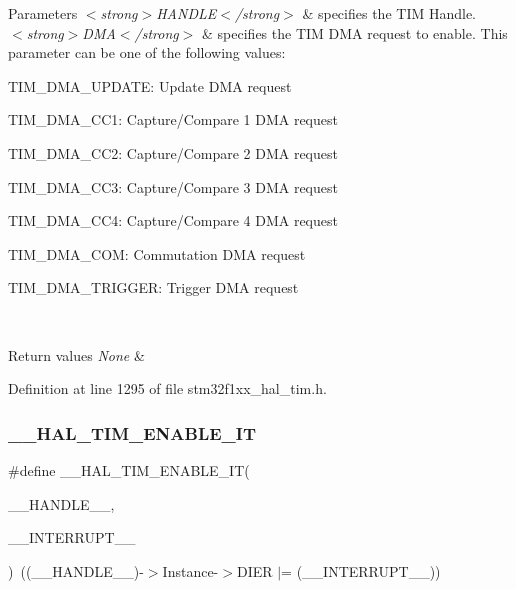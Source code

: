 \begin{DoxyParams}{Parameters}
{\em $<$strong$>$\+H\+A\+N\+D\+L\+E$<$/strong$>$} & specifies the T\+IM Handle. \\
\hline
{\em $<$strong$>$\+D\+M\+A$<$/strong$>$} & specifies the T\+IM D\+MA request to enable. This parameter can be one of the following values\+: \begin{DoxyItemize}
\item T\+I\+M\+\_\+\+D\+M\+A\+\_\+\+U\+P\+D\+A\+TE\+: Update D\+MA request \item T\+I\+M\+\_\+\+D\+M\+A\+\_\+\+C\+C1\+: Capture/\+Compare 1 D\+MA request \item T\+I\+M\+\_\+\+D\+M\+A\+\_\+\+C\+C2\+: Capture/\+Compare 2 D\+MA request \item T\+I\+M\+\_\+\+D\+M\+A\+\_\+\+C\+C3\+: Capture/\+Compare 3 D\+MA request \item T\+I\+M\+\_\+\+D\+M\+A\+\_\+\+C\+C4\+: Capture/\+Compare 4 D\+MA request \item T\+I\+M\+\_\+\+D\+M\+A\+\_\+\+C\+OM\+: Commutation D\+MA request \item T\+I\+M\+\_\+\+D\+M\+A\+\_\+\+T\+R\+I\+G\+G\+ER\+: Trigger D\+MA request \end{DoxyItemize}
\\
\hline
\end{DoxyParams}

\begin{DoxyRetVals}{Return values}
{\em None} & \\
\hline
\end{DoxyRetVals}


Definition at line 1295 of file stm32f1xx\+\_\+hal\+\_\+tim.\+h.

\mbox{\label{group___t_i_m___exported___macros_ga4d69943bc4716743c78e3194e259097e}} 
\subsubsection{\texorpdfstring{\+\_\+\+\_\+\+H\+A\+L\+\_\+\+T\+I\+M\+\_\+\+E\+N\+A\+B\+L\+E\+\_\+\+IT}{\_\_HAL\_TIM\_ENABLE\_IT}}
{\footnotesize\ttfamily \#define \+\_\+\+\_\+\+H\+A\+L\+\_\+\+T\+I\+M\+\_\+\+E\+N\+A\+B\+L\+E\+\_\+\+IT(\begin{DoxyParamCaption}\item[{}]{\+\_\+\+\_\+\+H\+A\+N\+D\+L\+E\+\_\+\+\_\+,  }\item[{}]{\+\_\+\+\_\+\+I\+N\+T\+E\+R\+R\+U\+P\+T\+\_\+\+\_\+ }\end{DoxyParamCaption})~((\+\_\+\+\_\+\+H\+A\+N\+D\+L\+E\+\_\+\+\_\+)-\/$>$Instance-\/$>$D\+I\+ER $\vert$= (\+\_\+\+\_\+\+I\+N\+T\+E\+R\+R\+U\+P\+T\+\_\+\+\_\+))}



